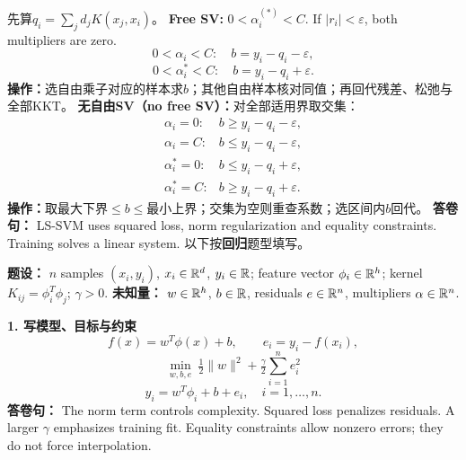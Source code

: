 先算$q_i=\sum_jd_jK(x_j,x_i)$。 \textbf{Free SV:} $0<\alpha_i^{(*)}<C$.
If $|r_i|<\varepsilon$, both multipliers are zero.
\[0<\alpha_i<C:\quad b=y_i-q_i-\varepsilon,\]
\[0<\alpha_i^*<C:\quad b=y_i-q_i+\varepsilon.\]
\textbf{操作：}选自由乘子对应的样本求$b$；其他自由样本核对同值；再回代残差、松弛与全部KKT。
\textbf{无自由SV（no free SV）：}对全部适用界取交集：
\[\begin{array}{ll}
\alpha_i=0:&b\ge y_i-q_i-\varepsilon,\\
\alpha_i=C:&b\le y_i-q_i-\varepsilon,\\
\alpha_i^*=0:&b\le y_i-q_i+\varepsilon,\\
\alpha_i^*=C:&b\ge y_i-q_i+\varepsilon.
\end{array}\]
\textbf{操作：}取最大下界$\le b\le$最小上界；交集为空则重查系数；选区间内$b$回代。
\columnend\sepcol
\columnstart
{}
\textbf{答卷句：} LS-SVM uses squared loss, norm regularization and equality constraints. Training solves a linear system. 以下按\textbf{回归}题型填写。

\textbf{题设：} $n$ samples $(x_i,y_i)$, $x_i\in\mathbb{R}^d$, $y_i\in\mathbb{R}$; feature vector $\phi_i\in\mathbb{R}^h$; kernel $K_{ij}=\phi_i^T\phi_j$; $\gamma>0$.
\textbf{未知量：} $w\in\mathbb{R}^h$, $b\in\mathbb{R}$, residuals $e\in\mathbb{R}^n$, multipliers $\alpha\in\mathbb{R}^n$.

\textbf{1. 写模型、目标与约束}
\[f(x)=w^T\phi(x)+b,\qquad e_i=y_i-f(x_i),\]
\[\boxed{\min_{w,b,e}\ \tfrac12\|w\|^2+\tfrac\gamma2\sum_{i=1}^n e_i^2}\]
\[\boxed{y_i=w^T\phi_i+b+e_i,\quad i=1,\ldots,n.}\]
\textbf{答卷句：} The norm term controls complexity. Squared loss penalizes residuals. A larger $\gamma$ emphasizes training fit. Equality constraints allow nonzero errors; they do not force interpolation.

